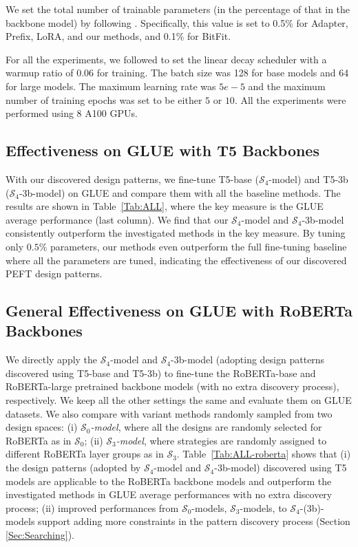 We set the total number of trainable parameters (in the percentage of that in the backbone model) by following \citet{https://doi.org/10.48550/arxiv.2110.04366}. Specifically, this value is set to 0.5\% for  Adapter, Prefix,  LoRA,  and our  methods, and 0.1\% for  BitFit. 

For all the experiments, we followed \citet{liu2019roberta} to set the linear decay scheduler with a warmup ratio of 0.06 for training. The batch size was 128 for base models and 64 for large models. The maximum learning rate was $5e-5$ and the maximum number of training epochs was set to be either $5$ or $10$. All the experiments were performed using 8 A100 GPUs.

\subsection{Effectiveness on GLUE with T5 Backbones}

With our discovered design patterns, we fine-tune T5-base ($\mathcal{S}_4$-model) and T5-3b ($\mathcal{S}_4$-3b-model) on GLUE and compare them with all the baseline methods. The results are shown in Table~\ref{Tab:ALL}, where the key measure is the GLUE average performance (last column). We find that our $\mathcal{S}_4$-model and  $\mathcal{S}_4$-3b-model consistently outperform  the investigated methods in the key measure. By tuning only $0.5\%$ parameters, our methods even outperform the full fine-tuning baseline where all the parameters are tuned, indicating the effectiveness of our discovered PEFT design patterns. 

\subsection{General Effectiveness on GLUE with RoBERTa Backbones}
\label{subsec:effective-roberta}

We directly apply the 
$\mathcal{S}_4$-model and $\mathcal{S}_4$-3b-model (adopting design patterns discovered using T5-base and T5-3b) to fine-tune the RoBERTa-base and RoBERTa-large pretrained backbone models (with no extra discovery process), respectively. We keep all the other settings the same and evaluate them on GLUE datasets. We also compare with variant methods randomly sampled from two design spaces: (i) \textit{$\mathcal{S}_0$-model}, where all the designs are randomly selected for RoBERTa as in $\mathcal{S}_0$; (ii) \textit{$\mathcal{S}_3$-model}, where strategies are randomly assigned to different RoBERTa layer groups as in $\mathcal{S}_3$.
Table~\ref{Tab:ALL-roberta} shows that (i) the design patterns (adopted by $\mathcal{S}_4$-model and $\mathcal{S}_4$-3b-model) discovered using T5 models are applicable to the RoBERTa backbone models and outperform the investigated methods in GLUE average performances with no extra discovery process; (ii) improved performances from $\mathcal{S}_0$-models, $\mathcal{S}_3$-models, to $\mathcal{S}_4$-(3b)-models support adding more constraints in the pattern discovery process (Section \ref{Sec:Searching}).

